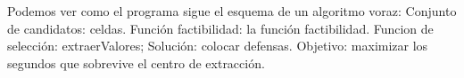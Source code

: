 Podemos ver como el programa sigue el esquema de un algoritmo voraz:
Conjunto de candidatos: celdas.
Función factibilidad: la función factibilidad.
Funcion de selección: extraerValores;
Solución: colocar defensas.
Objetivo: maximizar los segundos que sobrevive el centro de extracción.


